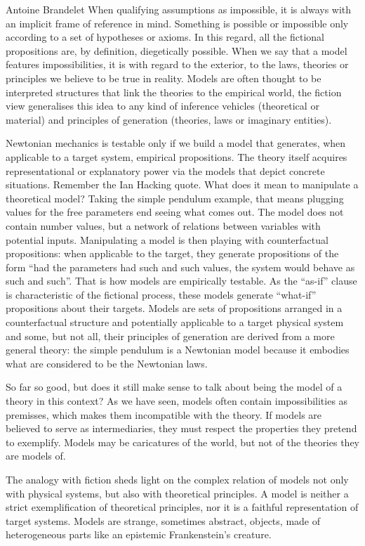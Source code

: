\begin{artengenv}{Antoine Brandelet}
When qualifying assumptions as impossible, it is always with an implicit frame of reference in mind. Something is possible or impossible only according to a set of hypotheses or axioms. In this regard, all the fictional propositions are, by definition, diegetically possible. When we say that a model features impossibilities, it is with regard to the exterior, to the laws, theories or principles we believe to be true in reality. Models are often thought to be interpreted structures that link the theories to the empirical world, the fiction view generalises this idea to any kind of inference vehicles (theoretical or material) and principles of generation (theories, laws or imaginary entities).

Newtonian mechanics is testable only if we build a model that generates, when applicable to a target system, empirical propositions. The theory itself acquires representational or explanatory power via the models that depict concrete situations. Remember the Ian Hacking quote. What does it mean to manipulate a theoretical model? Taking the simple pendulum example, that means plugging values for the free parameters end seeing what comes out. The model does not contain number values, but a network of relations between variables with potential inputs. Manipulating a model is then playing with counterfactual propositions: when applicable to the target, they generate propositions of the form ``had the parameters had such and such values, the system would behave as such and such''. That is how models are empirically testable. As the ``as-if'' clause is characteristic of the fictional process, these models generate ``what-if'' propositions about their targets. Models are sets of propositions arranged in a counterfactual structure and potentially applicable to a target physical system and some, but not all, their principles of generation are derived from a more general theory: the simple pendulum is a Newtonian model because it embodies what are considered to be the Newtonian laws.

So far so good, but does it still make sense to talk about being the model of a theory in this context? As we have seen, models often contain impossibilities as premisses, which makes them incompatible with the theory. If models are believed to serve as intermediaries, they must respect the properties they pretend to exemplify. Models may be caricatures of the world, but not of the theories they are models of.

The analogy with fiction sheds light on the complex relation of models not only with physical systems, but also with theoretical principles. A model is neither a strict exemplification of theoretical principles, nor it is a faithful representation of target systems. Models are strange, sometimes abstract, objects, made of heterogeneous parts like an epistemic Frankenstein's creature.


\end{artengenv}
